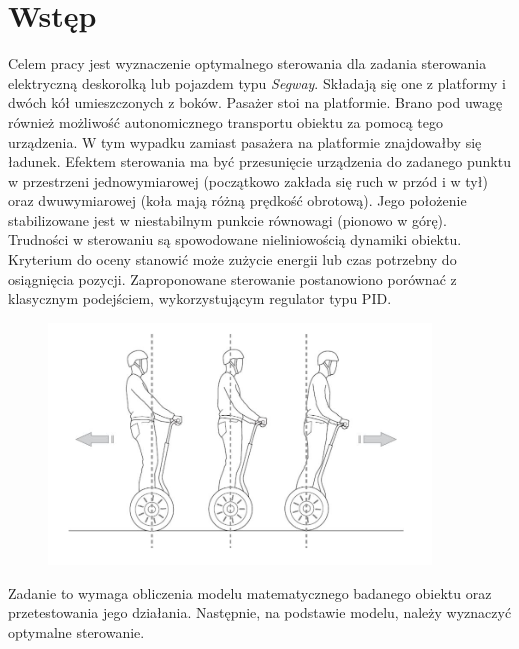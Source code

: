 \section{Wstęp}
\label{sec:wstep}

Celem pracy jest wyznaczenie optymalnego sterowania dla zadania sterowania elektryczną deskorolką lub pojazdem typu \textit{Segway}. Składają się one z platformy i dwóch kół umieszczonych z boków. Pasażer stoi na platformie. Brano pod uwagę również możliwość autonomicznego transportu obiektu za pomocą tego urządzenia. W tym wypadku zamiast pasażera na platformie znajdowałby się ładunek. Efektem sterowania ma być przesunięcie urządzenia do zadanego punktu w przestrzeni jednowymiarowej (początkowo zakłada się ruch w przód i w tył) oraz dwuwymiarowej (koła mają różną prędkość obrotową). Jego położenie stabilizowane jest w niestabilnym punkcie równowagi (pionowo w górę). Trudności w sterowaniu są spowodowane nieliniowością dynamiki obiektu. Kryterium do oceny stanowić może zużycie energii lub czas potrzebny do osiągnięcia pozycji. Zaproponowane sterowanie postanowiono porównać z klasycznym podejściem, wykorzystującym regulator typu PID.

\begin{figure}[h]
	\centering
	\includegraphics[width=4in]{Figures/wstep_segway.jpg}
	\label{fig:wstep_segway}
\end{figure}

Zadanie to wymaga obliczenia modelu matematycznego badanego obiektu oraz przetestowania jego działania. Następnie, na podstawie modelu, należy wyznaczyć optymalne sterowanie.